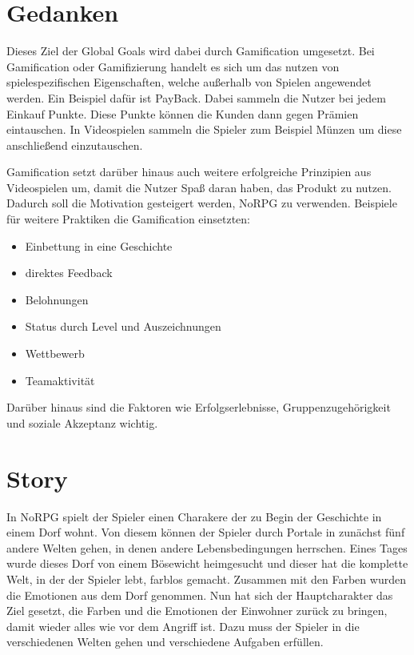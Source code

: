 	
\section{Gedanken} %

Dieses Ziel der Global Goals wird dabei durch Gamification umgesetzt. Bei Gamification oder Gamifizierung handelt es sich um das nutzen von spielespezifischen Eigenschaften, welche außerhalb von Spielen angewendet werden. Ein Beispiel dafür ist PayBack. Dabei sammeln die Nutzer bei jedem Einkauf Punkte. Diese Punkte können die Kunden dann gegen Prämien eintauschen. In Videospielen sammeln die Spieler zum Beispiel Münzen um diese anschließend einzutauschen. 

Gamification setzt darüber hinaus auch weitere erfolgreiche Prinzipien aus Videospielen um, damit die Nutzer Spaß daran haben, das Produkt zu nutzen. Dadurch soll die Motivation gesteigert werden, NoRPG zu verwenden. Beispiele für weitere Praktiken die Gamification einsetzten:
\begin{itemize}
\item Einbettung in eine Geschichte
\item direktes Feedback
\item Belohnungen
\item Status durch Level und Auszeichnungen
\item Wettbewerb
\item Teamaktivität
\end{itemize}

Darüber hinaus sind die Faktoren wie Erfolgserlebnisse, Gruppenzugehörigkeit und soziale Akzeptanz wichtig.

	
\section{Story}

In NoRPG spielt der Spieler einen Charakere der zu Begin der Geschichte in einem Dorf wohnt. Von diesem können der Spieler durch Portale in zunächst fünf andere Welten gehen, in denen andere Lebensbedingungen herrschen. Eines Tages wurde dieses Dorf von einem Bösewicht heimgesucht und dieser hat die komplette Welt, in der der Spieler lebt, farblos gemacht. Zusammen mit den Farben wurden die Emotionen aus dem Dorf genommen. Nun hat sich der Hauptcharakter das Ziel gesetzt, die Farben und die Emotionen der Einwohner zurück zu bringen, damit wieder alles wie vor dem Angriff ist. Dazu muss der Spieler in die verschiedenen Welten gehen und verschiedene Aufgaben erfüllen.

